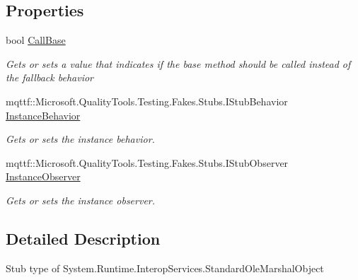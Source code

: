 \subsection*{Properties}
\begin{DoxyCompactItemize}
\item 
bool \hyperlink{class_system_1_1_runtime_1_1_interop_services_1_1_fakes_1_1_stub_standard_ole_marshal_object_a182fba91caae78a5dd97fea1c5d8da0c}{Call\-Base}
\begin{DoxyCompactList}\small\item\em Gets or sets a value that indicates if the base method should be called instead of the fallback behavior\end{DoxyCompactList}\item 
mqttf\-::\-Microsoft.\-Quality\-Tools.\-Testing.\-Fakes.\-Stubs.\-I\-Stub\-Behavior \hyperlink{class_system_1_1_runtime_1_1_interop_services_1_1_fakes_1_1_stub_standard_ole_marshal_object_a62f581f22e509ef5018a42f3ec38cc95}{Instance\-Behavior}
\begin{DoxyCompactList}\small\item\em Gets or sets the instance behavior.\end{DoxyCompactList}\item 
mqttf\-::\-Microsoft.\-Quality\-Tools.\-Testing.\-Fakes.\-Stubs.\-I\-Stub\-Observer \hyperlink{class_system_1_1_runtime_1_1_interop_services_1_1_fakes_1_1_stub_standard_ole_marshal_object_a542b1c865c60bc80c26a03f98f69e912}{Instance\-Observer}
\begin{DoxyCompactList}\small\item\em Gets or sets the instance observer.\end{DoxyCompactList}\end{DoxyCompactItemize}


\subsection{Detailed Description}
Stub type of System.\-Runtime.\-Interop\-Services.\-Standard\-Ole\-Marshal\-Object



